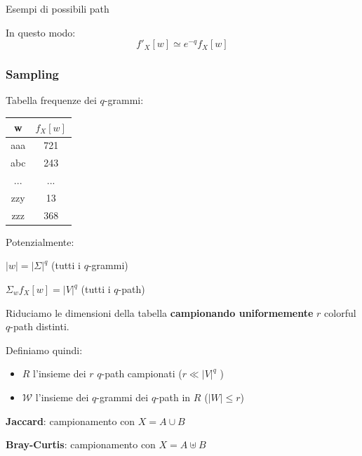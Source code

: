 \begin{frame}
\begin{minipage}{.45\textwidth}
			Esempi di possibili path\medskip
			
			In questo modo:
			\begin{equation*}
				f'_X[w] \simeq e^{-q} f_X[w]
			\end{equation*}
			\hfill
		\end{minipage}\hfill

\end{frame}

\begin{frame}
	\frametitle{Sampling}
	\centering
	
	\begin{minipage}{.45\textwidth}
		\centering
		
		Tabella frequenze dei $q$-grammi: \medskip
		
		\begin{tabular}{|c|c|}
			\hline
			w   & $f_X[w]$  \\ \hline
			aaa &  721 \\ \hline
			abc &  243 \\ \hline
			... & ... \\ \hline
			zzy &   13 \\ \hline
			zzz &   368 \\ \hline
		\end{tabular}
	
		\medskip
		Potenzialmente:
		\medskip		 
		
		$|w| = |\Sigma|^q$ (tutti i $q$-grammi)
		\medskip		 
		 
		$\Sigma_w{f_X[w]} = |V|^q$ (tutti i $q$-path)
		
		
	\end{minipage}\hfill
	\begin{minipage}{.45\textwidth}
		\centering
		Riduciamo le dimensioni della tabella \textbf{campionando uniformemente} $r$ colorful $q$-path distinti.\medskip
		
		Definiamo quindi:
		
		\begin{itemize}
			\item $R$ l'insieme dei $r$ $q$-path campionati ($r \ll |V|^q$ )
			\item $\mathcal{W}$ l'insieme dei $q$-grammi dei $q$-path in $R$ ($|W| \leq r$)
		\end{itemize}
		
		
		
		\hfill
	\end{minipage}\hfill

	\bigskip
	
	\textbf{Jaccard}: campionamento con $X = A \cup B$
	
	\textbf{Bray-Curtis}: campionamento con $X = A \uplus B$
	
	
	
\end{frame}

